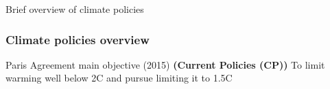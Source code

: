 \begin{frame}
\begin{center}
\Huge Brief overview of \textcolor{mygreen}{climate policies}
\end{center}
\end{frame}

\begin{frame}
\frametitle{Climate policies overview}
\begin{alertblock}{Paris Agreement main objective (2015) \textbf{(Current Policies (CP))}}
    To limit warming well below 2\deg C and pursue limiting it to 1.5\deg C    
\end{alertblock}
\vspace{1cm}
\end{frame}

